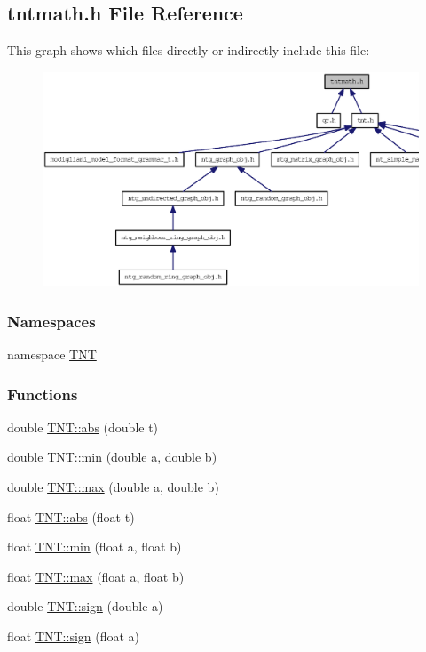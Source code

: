 \subsection{tntmath.h File Reference}
\label{tntmath_8h}
This graph shows which files directly or indirectly include this file:
\nopagebreak
\begin{figure}[H]
\begin{center}
\leavevmode
\includegraphics[width=400pt]{tntmath_8h__dep__incl}
\end{center}
\end{figure}
\subsubsection*{Namespaces}
\begin{DoxyCompactItemize}
\item 
namespace \hyperlink{namespace_t_n_t}{TNT}
\end{DoxyCompactItemize}
\subsubsection*{Functions}
\begin{DoxyCompactItemize}
\item 
double \hyperlink{namespace_t_n_t_a17457baa8ac851d47ef41cccc17b5135}{TNT::abs} (double t)
\item 
double \hyperlink{namespace_t_n_t_a6ff7d17e22c75eb3f9fc404115336c88}{TNT::min} (double a, double b)
\item 
double \hyperlink{namespace_t_n_t_a8301e96db6ebead2ce5ab13cfc2593f5}{TNT::max} (double a, double b)
\item 
float \hyperlink{namespace_t_n_t_add6aba1405d7b48fe08d8a6e422df7d9}{TNT::abs} (float t)
\item 
float \hyperlink{namespace_t_n_t_a1c3e18bd5476f272e0f55977a6205431}{TNT::min} (float a, float b)
\item 
float \hyperlink{namespace_t_n_t_a410c74797b51063ddac92537157c69ec}{TNT::max} (float a, float b)
\item 
double \hyperlink{namespace_t_n_t_a051812668d41cc65f9b8f0518e47b466}{TNT::sign} (double a)
\item 
float \hyperlink{namespace_t_n_t_a06dc1f86f3df1501d7f3e49c89c5bf2a}{TNT::sign} (float a)
\end{DoxyCompactItemize}
